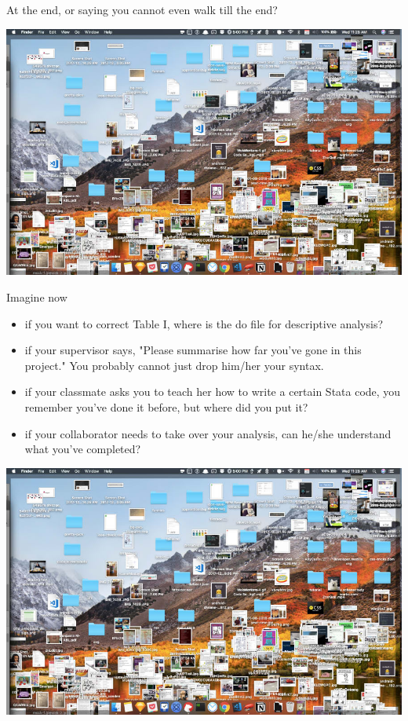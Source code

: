 \begin{frame}{\secname}
At the end, or saying you cannot even walk till the end?

\begin{center}
		\includegraphics[scale=0.3]{image/more-messy-desktop}
\end{center}
\end{frame}

\begin{frame}{\secname}
Imagine now 
\begin{itemize}[<+->]
	\item if you want to correct Table I, where is the do file for descriptive analysis?
	\item if your supervisor says, "Please summarise how far you've gone in this project." You probably cannot just drop him/her your syntax. 
	\item if your classmate asks you to teach her how to write a certain Stata code, you remember you've done it before, but where did you put it?
	\item if your collaborator needs to take over your analysis, can he/she understand what you've completed?
\end{itemize}
\end{frame}

\begin{frame}{\secname}

\begin{center}
		\includegraphics[scale=0.3]{image/more-messy-desktop}
\end{center}
\end{frame}

